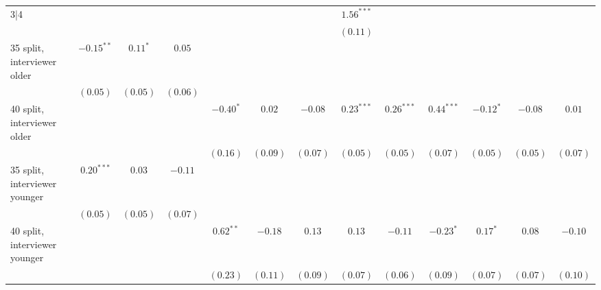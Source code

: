 \begin{table}
\begin{center}
\begin{threeparttable}
\begin{tabular}{l c c c c c c c c c c c c}
3|4                             &               &               &               &              &               &               & $1.56^{***}$  &               &               &               &               &               \\
                                &               &               &               &              &               &               & $(0.11)$      &               &               &               &               &               \\
35 split, interviewer older     & $-0.15^{**}$  & $0.11^{*}$    & $0.05$        &              &               &               &               &               &               &               &               &               \\
                                & $(0.05)$      & $(0.05)$      & $(0.06)$      &              &               &               &               &               &               &               &               &               \\
40 split, interviewer older     &               &               &               & $-0.40^{*}$  & $0.02$        & $-0.08$       & $0.23^{***}$  & $0.26^{***}$  & $0.44^{***}$  & $-0.12^{*}$   & $-0.08$       & $0.01$        \\
                                &               &               &               & $(0.16)$     & $(0.09)$      & $(0.07)$      & $(0.05)$      & $(0.05)$      & $(0.07)$      & $(0.05)$      & $(0.05)$      & $(0.07)$      \\
35 split, interviewer younger   & $0.20^{***}$  & $0.03$        & $-0.11$       &              &               &               &               &               &               &               &               &               \\
                                & $(0.05)$      & $(0.05)$      & $(0.07)$      &              &               &               &               &               &               &               &               &               \\
40 split, interviewer younger   &               &               &               & $0.62^{**}$  & $-0.18$       & $0.13$        & $0.13$        & $-0.11$       & $-0.23^{*}$   & $0.17^{*}$    & $0.08$        & $-0.10$       \\
                                &               &               &               & $(0.23)$     & $(0.11)$      & $(0.09)$      & $(0.07)$      & $(0.06)$      & $(0.09)$      & $(0.07)$      & $(0.07)$      & $(0.10)$      \\

\end{tabular}
\end{threeparttable}
\end{center}
\end{table}
